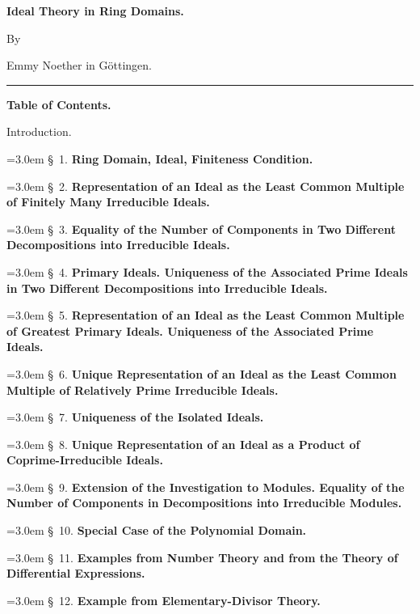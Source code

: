 \documentclass[11pt]{article}
\begin{document}
\begin{center}

{\Large\bfseries Ideal Theory in Ring Domains.}\par
\vspace{0.7em}
By\par
\vspace{0.25em}
Emmy Noether in Göttingen.\par
\vspace{0.9em}
\rule{4em}{0.4pt}\par
\vspace{0.9em}
{\large\bfseries Table of Contents.}
\end{center}
\noindent Introduction.\par
\noindent\hangindent=3.0em \S~1. \textbf{Ring Domain, Ideal, Finiteness Condition.}\par
\noindent\hangindent=3.0em \S~2. \textbf{Representation of an Ideal as the Least Common Multiple of Finitely Many Irreducible Ideals.}\par
\noindent\hangindent=3.0em \S~3. \textbf{Equality of the Number of Components in Two Different Decompositions into Irreducible Ideals.}\par
\noindent\hangindent=3.0em \S~4. \textbf{Primary Ideals. Uniqueness of the Associated Prime Ideals in Two Different Decompositions into Irreducible Ideals.}\par
\noindent\hangindent=3.0em \S~5. \textbf{Representation of an Ideal as the Least Common Multiple of Greatest Primary Ideals. Uniqueness of the Associated Prime Ideals.}\par
\noindent\hangindent=3.0em \S~6. \textbf{Unique Representation of an Ideal as the Least Common Multiple of Relatively Prime Irreducible Ideals.}\par
\noindent\hangindent=3.0em \S~7. \textbf{Uniqueness of the Isolated Ideals.}\par
\noindent\hangindent=3.0em \S~8. \textbf{Unique Representation of an Ideal as a Product of Coprime-Irreducible Ideals.}\par
\noindent\hangindent=3.0em \S~9. \textbf{Extension of the Investigation to Modules. Equality of the Number of Components in Decompositions into Irreducible Modules.}\par
\noindent\hangindent=3.0em \S~10. \textbf{Special Case of the Polynomial Domain.}\par
\noindent\hangindent=3.0em \S~11. \textbf{Examples from Number Theory and from the Theory of Differential Expressions.}\par
\noindent\hangindent=3.0em \S~12. \textbf{Example from Elementary-Divisor Theory.}\par
\end{document}
